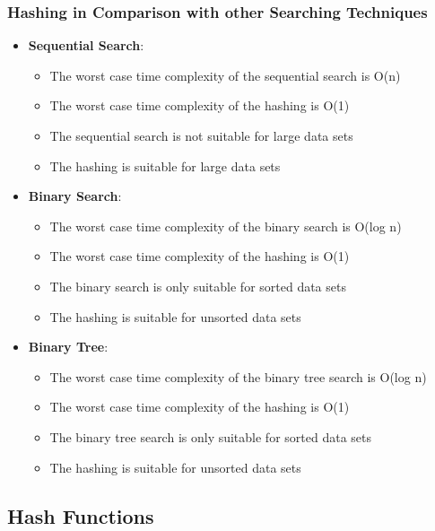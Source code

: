 \documentclass[11pt]{article}
\begin{document}
\subsubsection{Hashing in Comparison with other Searching Techniques}
\begin{itemize}
    \item \textbf{Sequential Search}:
        \begin{itemize}
            \item The worst case time complexity of the sequential search is
            O(n)
            \item The worst case time complexity of the hashing is O(1)
            \item The sequential search is not suitable for large data sets
            \item The hashing is suitable for large data sets
        \end{itemize}
    \item \textbf{Binary Search}:
        \begin{itemize}
            \item The worst case time complexity of the binary search is O(log
            n)
            \item The worst case time complexity of the hashing is O(1)
            \item The binary search is only suitable for sorted data sets
            \item The hashing is suitable for unsorted data sets
        \end{itemize}
    \item \textbf{Binary Tree}:
        \begin{itemize}
            \item The worst case time complexity of the binary tree search is
            O(log n)
            \item The worst case time complexity of the hashing is O(1)
            \item The binary tree search is only suitable for sorted data sets
            \item The hashing is suitable for unsorted data sets
        \end{itemize}
\end{itemize}

\subsection{Hash Functions}
\end{document}
